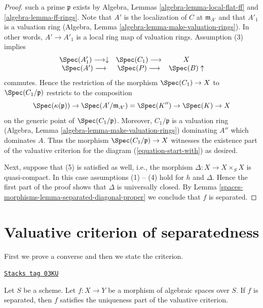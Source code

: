 \begin{proof}
such a prime $\mathfrak p$ exists by
Algebra, Lemmas \ref{algebra-lemma-local-flat-ff} and
\ref{algebra-lemma-ff-rings}.
Note that $A'$ is the localization of $C$ at $\mathfrak m_{A'}$
and that $A'_1$ is a valuation ring
(Algebra, Lemma \ref{algebra-lemma-make-valuation-rings}).
In other words, $A' \to A'_1$ is a local ring map of valuation
rings. Assumption (3) implies
$$
\begin{array}{ccc}\Spec(A'_1) \longrightarrow\downarrow & \Spec(C_1) \longrightarrow & X \\ \Spec(A') \longrightarrow & \Spec(P) \longrightarrow & \Spec(B) \uparrow\end{array}
$$
commutes. Hence the restriction of the morphism $\Spec(C_1) \to X$
to $\Spec(C_1/\mathfrak p)$ restricts to the composition
$$
\Spec(\kappa(\mathfrak p)) \to
\Spec(A'/\mathfrak m_{A'}) = \Spec(K'') \to
\Spec(K) \to X
$$
on the generic point of $\Spec(C_1/\mathfrak p)$. Moreover,
$C_1/\mathfrak p$ is a valuation ring
(Algebra, Lemma \ref{algebra-lemma-make-valuation-rings})
dominating $A''$ which dominates $A$.
Thus the morphism $\Spec(C_1/\mathfrak p) \to X$ witnesses the
existence part of the valuative criterion for the diagram
(\ref{equation-start-with}) as desired.

\medskip\noindent
Next, suppose that (5) is satisfied as well, i.e., the morphism
$\Delta : X \to X \times_S X$ is quasi-compact. In this case
assumptions (1) -- (4) hold for $h$ and $\Delta$. Hence the first
part of the proof shows that $\Delta$ is universally closed.
By Lemma \ref{spaces-morphisms-lemma-separated-diagonal-proper} we conclude that
$f$ is separated.
\end{proof}

\section{Valuative criterion of separatedness}
\label{spaces-morphisms-section-valuative-separatedness}
First we prove a converse and then we state the criterion.

\begin{lemma}
\label{spaces-morphisms-lemma-separated-implies-valuative}
\href{https://stacks.math.columbia.edu/tag/03KU}{\texttt{Stacks tag 03KU}}

Let $S$ be a scheme.
Let $f : X \to Y$ be a morphism of algebraic spaces over $S$.
If $f$ is separated, then $f$ satisfies the uniqueness
part of the valuative criterion.
\end{lemma}


